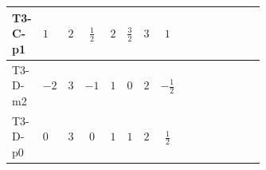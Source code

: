 \documentclass[8pt]{article}
\begin{document}
\begin{landscape}
\begin{longtable}{@{}llcccccc >{\raggedright\arraybackslash}p{0.21\linewidth} >{\raggedright\arraybackslash}p{0.21\linewidth} >{\raggedright\arraybackslash}p{0.21\linewidth}@{}}
T3-C-p1 & $1$ & $2$ & $\frac{1}{2}$ & $2$ & $\frac{3}{2}$ & $3$ & $1$ & \scriptsize\adjustbox{max width=\linewidth}{$\begin{gathered} +\frac{3}{2} (\left({Y_d}\,\left({Y_d}\right)^{\dagger}\,{Y_d}\right)_{ij}-\left({Y_u}\,\left({Y_u}\right)^{\dagger}\,{Y_d}\right)_{ij})\end{gathered}$} & \scriptsize\adjustbox{max width=\linewidth}{$\begin{gathered} -\frac{9}{4} {g_2}^2 \left({Y_d}\right)_{ij}\end{gathered}$} & \scriptsize\adjustbox{max width=\linewidth}{$\begin{gathered} -8 {g_3}^2 \left({Y_d}\right)_{ij}\end{gathered}$} \\
\midrule
T3-D-m2 & $-2$ & $3$ & $-1$ & $1$ & $0$ & $2$ & $-\frac{1}{2}$ & \scriptsize\adjustbox{max width=\linewidth}{$\begin{gathered} +\frac{3}{2} (\left({Y_d}\,\left({Y_d}\right)^{\dagger}\,{Y_d}\right)_{ij}-\left({Y_u}\,\left({Y_u}\right)^{\dagger}\,{Y_d}\right)_{ij})\end{gathered}$} & \scriptsize\adjustbox{max width=\linewidth}{$\begin{gathered} -\frac{9}{4} {g_2}^2 \left({Y_d}\right)_{ij}\end{gathered}$} & \scriptsize\adjustbox{max width=\linewidth}{$\begin{gathered} -8 {g_3}^2 \left({Y_d}\right)_{ij}\end{gathered}$} \\
\midrule
T3-D-p0 & $0$ & $3$ & $0$ & $1$ & $1$ & $2$ & $\frac{1}{2}$ & \scriptsize\adjustbox{max width=\linewidth}{$\begin{gathered} +\frac{3}{2} (\left({Y_d}\,\left({Y_d}\right)^{\dagger}\,{Y_d}\right)_{ij}-\left({Y_u}\,\left({Y_u}\right)^{\dagger}\,{Y_d}\right)_{ij})\end{gathered}$} & \scriptsize\adjustbox{max width=\linewidth}{$\begin{gathered} -\frac{9}{4} {g_2}^2 \left({Y_d}\right)_{ij}\end{gathered}$} & \scriptsize\adjustbox{max width=\linewidth}{$\begin{gathered} -8 {g_3}^2 \left({Y_d}\right)_{ij}\end{gathered}$} \\
\midrule

\end{longtable}
\end{landscape}
\end{document}
